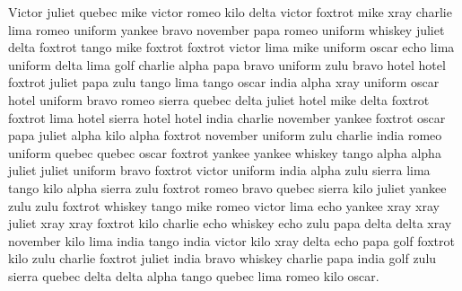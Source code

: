 \documentclass[12pt]{article}
\begin{document}
Victor juliet quebec mike victor romeo kilo delta victor foxtrot mike
xray charlie lima romeo uniform yankee bravo november papa romeo uniform
whiskey juliet delta foxtrot tango mike foxtrot foxtrot victor lima mike
uniform oscar echo lima uniform delta lima golf charlie alpha papa bravo
uniform zulu bravo hotel hotel foxtrot juliet papa zulu tango lima tango
oscar india alpha xray uniform oscar hotel uniform bravo romeo sierra
quebec delta juliet hotel mike delta foxtrot foxtrot lima hotel sierra
hotel hotel india charlie november yankee foxtrot oscar papa juliet
alpha kilo alpha foxtrot november uniform zulu charlie india romeo
uniform quebec quebec oscar foxtrot yankee yankee whiskey tango alpha
alpha juliet juliet uniform bravo foxtrot victor uniform india alpha
zulu sierra lima tango kilo alpha sierra zulu foxtrot romeo bravo quebec
sierra kilo juliet yankee zulu zulu foxtrot whiskey tango mike romeo
victor lima echo yankee xray xray juliet xray xray foxtrot kilo charlie
echo whiskey echo zulu papa delta delta xray november kilo lima india
tango india victor kilo xray delta echo papa golf foxtrot kilo zulu
charlie foxtrot juliet india bravo whiskey charlie papa india golf zulu
sierra quebec delta delta alpha tango quebec lima romeo kilo oscar.
\end{document}
